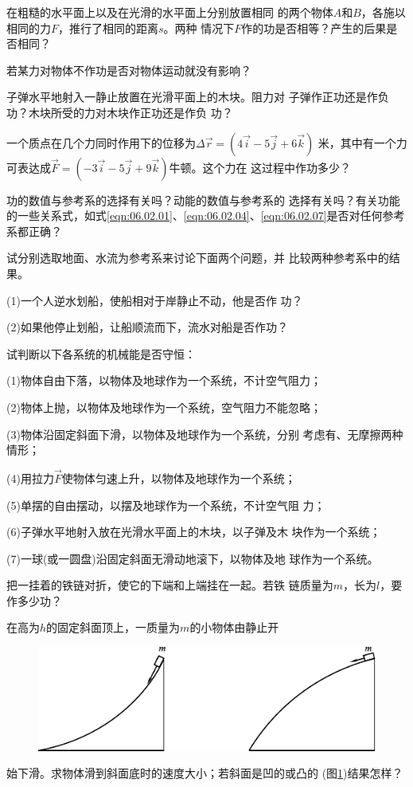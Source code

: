 \begin{questions}

  \question 在粗糙的水平面上以及在光滑的水平面上分别放置相同
  的两个物体$ A $和$ B $，各施以相同的力$ F $，推行了相同的距离$ s $。两种
  情况下$ F $作的功是否相等？产生的后果是否相同？

  \question 若某力对物体不作功是否对物体运动就没有影响？

  \question 子弹水平地射入一静止放置在光滑平面上的木块。阻力对
  子弹作正功还是作负功？木块所受的力对木块作正功还是作负
  功？

  \question 一个质点在几个力同时作用下的位移为$ \Delta \vec{r} = \left( 4 \vec{i} - 5 \vec{j} + 6 \vec{k} \right) $
  米，其中有一个力可表达成$ \vec{F} = \left( - 3 \vec{i} - 5 \vec{j} + 9 \vec{k} \right) $牛顿。这个力在
  这过程中作功多少？

  \question 功的数值与参考系的选择有关吗？动能的数值与参考系的
  选择有关吗？有关功能的一些关系式，如式\eqref{eqn:06.02.01}、\eqref{eqn:06.02.04}、\eqref{eqn:06.02.07}是否对任何参考系都正确？

  \question 试分别选取地面、水流为参考系来讨论下面两个问题，并
  比较两种参考系中的结果。

  (1)一个人逆水划船，使船相对于岸静止不动，他是否作
  功？

  (2)如果他停止划船，让船顺流而下，流水对船是否作功？

  \question 试判断以下各系统的机械能是否守恒：

  (1)物体自由下落，以物体及地球作为一个系统，不计空气阻力；

  (2)物体上抛，以物体及地球作为一个系统，空气阻力不能忽略；

  (3)物体沿固定斜面下滑，以物体及地球作为一个系统，分别
  考虑有、无摩擦两种情形；

  (4)用拉力$ \vec{F} $使物体匀速上升，以物体及地球作为一个系统；

  (5)单摆的自由摆动，以摆及地球作为一个系统，不计空气阻
  力；

  (6)子弹水平地射入放在光滑水平面上的木块，以子弹及木
  块作为一个系统；

  (7)一球(或一圆盘)沿固定斜面无滑动地滚下，以物体及地
  球作为一个系统。

  \question 把一挂着的铁链对折，使它的下端和上端挂在一起。若铁
  链质量为$ m $，长为$ l $，要作多少功？

  \question 在高为$ h $的固定斜面顶上，一质量为$ m $的小物体由静止开
  \begin{figure}[h]
    \centering
    \includegraphics{figure/fig06.14}
    \caption{}
    \label{fig:06.14}
    \vspace{-0.8em}
  \end{figure}
  \clearpage\noindent
  始下滑。求物体滑到斜面底时的速度大小；若斜面是凹的或凸的
  (图\ref{fig:06.14})结果怎样？


\end{questions}
